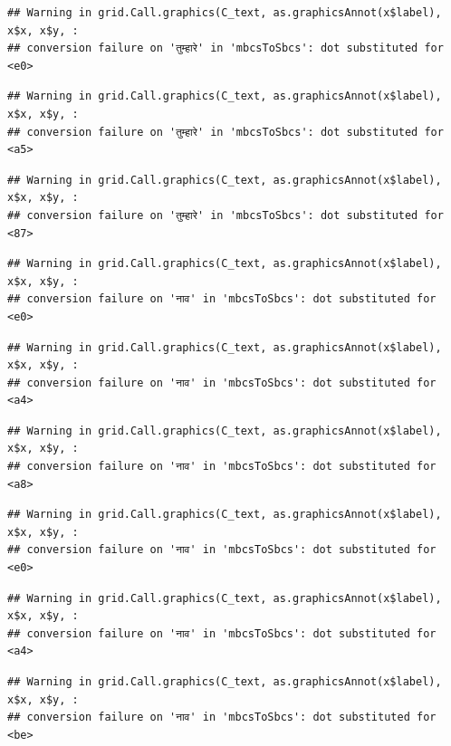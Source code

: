 \documentclass[
]{article}
\begin{document}
\begin{verbatim}
## Warning in grid.Call.graphics(C_text, as.graphicsAnnot(x$label), x$x, x$y, :
## conversion failure on 'तुम्हारे' in 'mbcsToSbcs': dot substituted for <e0>
\end{verbatim}

\begin{verbatim}
## Warning in grid.Call.graphics(C_text, as.graphicsAnnot(x$label), x$x, x$y, :
## conversion failure on 'तुम्हारे' in 'mbcsToSbcs': dot substituted for <a5>
\end{verbatim}

\begin{verbatim}
## Warning in grid.Call.graphics(C_text, as.graphicsAnnot(x$label), x$x, x$y, :
## conversion failure on 'तुम्हारे' in 'mbcsToSbcs': dot substituted for <87>
\end{verbatim}

\begin{verbatim}
## Warning in grid.Call.graphics(C_text, as.graphicsAnnot(x$label), x$x, x$y, :
## conversion failure on 'नाव' in 'mbcsToSbcs': dot substituted for <e0>
\end{verbatim}

\begin{verbatim}
## Warning in grid.Call.graphics(C_text, as.graphicsAnnot(x$label), x$x, x$y, :
## conversion failure on 'नाव' in 'mbcsToSbcs': dot substituted for <a4>
\end{verbatim}

\begin{verbatim}
## Warning in grid.Call.graphics(C_text, as.graphicsAnnot(x$label), x$x, x$y, :
## conversion failure on 'नाव' in 'mbcsToSbcs': dot substituted for <a8>
\end{verbatim}

\begin{verbatim}
## Warning in grid.Call.graphics(C_text, as.graphicsAnnot(x$label), x$x, x$y, :
## conversion failure on 'नाव' in 'mbcsToSbcs': dot substituted for <e0>
\end{verbatim}

\begin{verbatim}
## Warning in grid.Call.graphics(C_text, as.graphicsAnnot(x$label), x$x, x$y, :
## conversion failure on 'नाव' in 'mbcsToSbcs': dot substituted for <a4>
\end{verbatim}

\begin{verbatim}
## Warning in grid.Call.graphics(C_text, as.graphicsAnnot(x$label), x$x, x$y, :
## conversion failure on 'नाव' in 'mbcsToSbcs': dot substituted for <be>
\end{verbatim}
\end{document}

